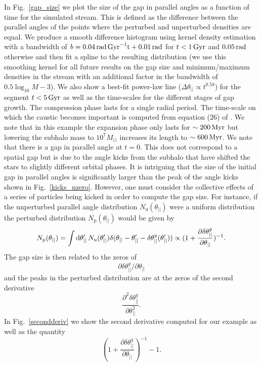 \documentclass[useAMS,usenatbib,fleqn,a4paper]{mn2e}
\def\d{{\rm d}}
\def\rad{\,\rm rad}
\def\Gyr{\,{\rm Gyr}}
\def\Myr{\,{\rm Myr}}
\begin{document}
In Fig.~\ref{gap_size} we plot the size of the gap in parallel angles as a function of time for the simulated stream. This is defined as the difference between the parallel angles of the points where the perturbed and unperturbed densities are equal. We produce a smooth difference histogram using kernel density estimation with a bandwidth of $b = 0.04\rad\Gyr^{-1}t+0.01\rad$ for $t<1\Gyr$ and $0.05\rad$ otherwise and then fit a spline to the resulting distribution (we use this smoothing kernel for all future results on the gap size and minimum/maximum densities in the stream with an additional factor in the bandwidth of $0.5\log_{10}M-3$). We also show a best-fit power-law line ($\Delta\theta_{||}\propto t^{0.58}$) for the segment $t<5\Gyr$ as well as the time-scales for the different stages of gap growth. The compression phase lasts for a single radial period. The time-scale on which the caustic becomes important is computed from equation (26) of \cite{ErkalBelokurov2015}. We note that in this example the expansion phase only lasts for $\sim200\Myr$ but lowering the subhalo mass to $10^7M_\odot$ increases its length to $\sim600\Myr$. We note that there is a gap in parallel angle at $t=0$. This does not correspond to a spatial gap but is due to the angle kicks from the subhalo that have shifted the stars to slightly different orbital phases. It is intriguing that the size of the initial gap in parallel angles is significantly larger than the peak of the angle kicks shown in Fig.~\ref{kicks_nzero}. However, one must consider the collective effects of a series of particles being kicked in order to compute the gap size. For instance, if the unperturbed parallel angle distribution $N_\mathrm{u}(\theta_{||})$ were a uniform distribution the perturbed distribution $N_\mathrm{p}(\theta_{||})$ would be given by
\begin{equation}
N_\mathrm{p}(\theta_{||})=\int \d\theta'_{||}\,N_\mathrm{u}(\theta'_{||})\delta(\theta_{||}-\theta'_{||}-\delta\theta^g_{||}(\theta'_{||}))\propto(1+\frac{\partial\delta\theta^g_{||}}{\partial\theta_{||}})^{-1}.
\label{UniformAssump}
\end{equation}
The gap size is then related to the zeros of
\[
\partial\delta\theta^g_{||}/\partial\theta_{||}
\]
and the peaks in the perturbed distribution are at the zeros of the second derivative
\[
\frac{\partial^2\delta\theta^g_{||}}{\partial\theta^{2}_{||}}.
\]
In Fig.~\ref{secondderiv} we show the second derivative computed for our example as well as the quantity
\begin{equation}
(1+\frac{\partial\delta\theta^g_{||}}{\partial\theta_{||}})^{-1}-1.
\label{deriv}
\end{equation}
\end{document}
